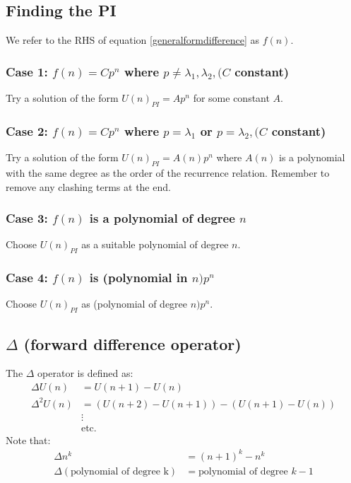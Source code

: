 \documentclass{scrartcl}
\begin{document}
\subsection{Finding the PI}

We refer to the RHS of equation \ref{generalformdifference} as $ f(n) $.

\subsubsection*{Case 1: $ f(n) = Cp^{n} $ where $ p \neq \lambda_{1}, \lambda_{2}, (C $ constant)}

Try a solution of the form $ U(n)_{PI} = Ap^{n} $ for some constant $ A $.

\subsubsection*{Case 2: $ f(n) = Cp^{n} $ where $ p = \lambda_{1} $ or $ p = \lambda_{2}, (C $ constant)}

Try a solution of the form $ U(n)_{PI} = A(n)p^{n} $ where $ A(n) $ is a polynomial with the same degree as the order of the recurrence relation. Remember to remove any clashing terms at the end.

\subsubsection*{Case 3: $ f(n) $ is a polynomial of degree $ n $}

Choose $ U(n)_{PI} $ as a suitable polynomial of degree $ n $.

\subsubsection*{Case 4: $ f(n) $ is (polynomial in $ n )p^{n}$}

Choose $ U(n)_{PI} $ as (polynomial of degree $ n)p^{n} $.

\subsection*{$ \Delta $ (forward difference operator)}

The $ \Delta $ operator is defined as:
\begin{align}
\Delta U(n) & = U(n+1) - U(n) \\
\Delta^{2} U(n) & = (U(n+2) - U(n+1)) - (U(n+1) - U(n)) \\
& \vdots \\ 
& \textrm{etc.}
\end{align}
Note that:
\begin{align}
\Delta n^{k} & = (n+1)^{k} - n^{k} \\
\Delta (\textrm{polynomial of degree k}) & = \textrm{polynomial of degree } k - 1
\end{align}
\end{document}
